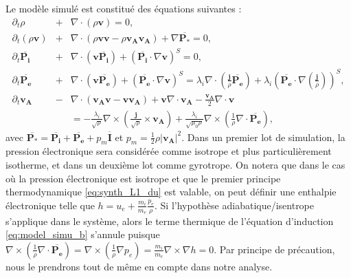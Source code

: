 Le modèle simulé est constitué des équations suivantes :
\begin{eqnarray}
\label{eq:model_simu_r} \partial_t \rho &+& \nabla \cdot \left(\rho \boldsymbol{v}\right) = 0,\\
\label{eq:model_simu_v} \partial_t \left(\rho \boldsymbol{v}\right) &+& \nabla \cdot \left(\rho \boldsymbol{v}\boldsymbol{v} - \rho \boldsymbol{v_A}\boldsymbol{v_A}\right) +  \nabla \overline{\boldsymbol{P_*}}  = 0,  \\
\label{eq:model_simu_Pi} \partial_t \overline{\boldsymbol{P_i}} &+& \nabla \cdot \left( \boldsymbol{v} \overline{\boldsymbol{P_i}} \right) +  \left(\overline{\boldsymbol{P_i}} \cdot \nabla \boldsymbol{v}\right)^S   = 0,  \\
\label{eq:model_simu_Pe} \partial_t \overline{\boldsymbol{P_{e}}} &+& \nabla \cdot \left( \boldsymbol{v}  \overline{\boldsymbol{P_{e}}} \right) +  \left(\overline{\boldsymbol{P_{e}}} \cdot \nabla \boldsymbol{v}\right)^S   =  \lambda_i \nabla \cdot  \left(\frac{\boldsymbol{j}}{\rho} \overline{\boldsymbol{P_{e}}}\right) +  \lambda_i \left(\overline{\boldsymbol{P_{e}}} \cdot \nabla \left(\frac{\boldsymbol{j}}{\rho} \right)\right)^S ,  \\
\label{eq:model_simu_b} \partial_t \boldsymbol{v_A} &-&  \nabla \cdot \left(\boldsymbol{v_A}\boldsymbol{v} - \boldsymbol{v}\boldsymbol{v_A}\right) +  \boldsymbol{v} \nabla \cdot \boldsymbol{v_A} -  \frac{\boldsymbol{v_A}}{2}  \nabla \cdot \boldsymbol{v} \nonumber \\ 
&&=  - \frac{\lambda_i}{ \sqrt{\rho} } \nabla \times\left(\frac{\boldsymbol{j}}{\sqrt{\rho}}  \times \boldsymbol{v_A}\right)  + \frac{\lambda_i}{ \sqrt{\mu_0\rho} }  \nabla \times \left(\frac{1}{\rho} \nabla \cdot \overline{\boldsymbol{P_{e}}}\right), 
\end{eqnarray}
 avec $\overline{\boldsymbol{P_*}} = \overline{\boldsymbol{P_{i}}} + \overline{\boldsymbol{P_{e}}}  + p_m \overline{\boldsymbol{I}} $ et $p_m = \frac{1}{2}\rho |\boldsymbol{v_A}|^2$. Dans un premier lot de simulation, la pression électronique sera considérée comme isotrope et plus particulièrement isotherme, et dans un deuxième lot comme gyrotrope. On notera que dans le cas où la pression électronique est isotrope et que le premier principe thermodynamique \eqref{eq:synth_L1_du} est valable, on peut définir une enthalpie électronique telle que $h = u_e + \frac{m_i}{m_e}\frac{p_e}{\rho}$. Si l'hypothèse adiabatique/isentrope s'applique dans le système, alors le terme thermique de l'équation d'induction \eqref{eq:model_simu_b} s'annule puisque $\nabla \times \left(\frac{1}{\rho} \nabla \cdot \overline{\boldsymbol{P_{e}}}\right) = \nabla \times \left(\frac{1}{\rho} \nabla p_{e}\right) = \frac{m_i}{m_e} \nabla \times \nabla h = 0$. Par principe de précaution, nous le prendrons tout de même en compte dans notre analyse.  

